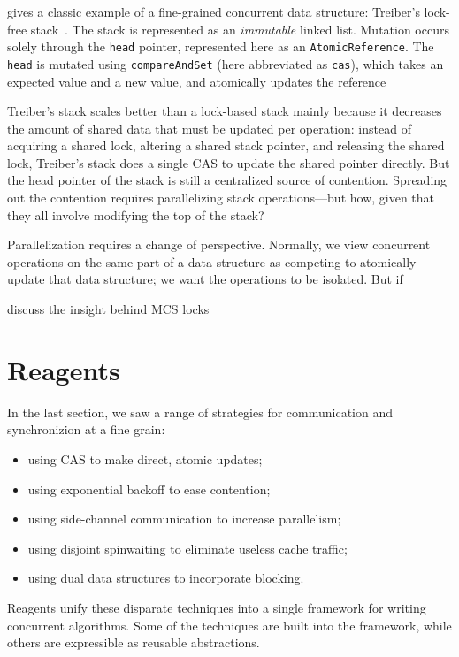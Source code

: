 \documentclass[preprint]{sigplanconf}
\begin{document}
 gives a classic example of a fine-grained
concurrent data structure: Treiber's lock-free stack~\cite{?}.  The
stack is represented as an \emph{immutable} linked list.  Mutation
occurs solely through the \lstinline{head} pointer, represented here
as an \lstinline{AtomicReference}.  The \lstinline{head} is mutated
using \lstinline{compareAndSet} (here abbreviated as \lstinline{cas}),
which takes an expected value and a new value, and atomically updates
the reference




Treiber's stack scales better than a lock-based stack mainly because
it decreases the amount of shared data that must be updated per
operation: instead of acquiring a shared lock, altering a shared stack
pointer, and releasing the shared lock, Treiber's stack does a single
CAS to update the shared pointer directly.  But the head pointer of
the stack is still a centralized source of contention.  Spreading out
the contention requires parallelizing stack operations---but how,
given that they all involve modifying the top of the stack?

Parallelization requires a change of perspective.  Normally, we view
concurrent operations on the same part of a data structure as
competing to atomically update that data structure; we want the
operations to be isolated.  But if 


discuss the insight behind MCS locks

\section{Reagents}
\label{sec:reagents}

In the last section, we saw a range of strategies for communication
and synchronizion at a fine grain:
\begin{itemize}
\item using CAS to make direct, atomic updates;
\item using exponential backoff to ease contention; 
\item using side-channel communication to increase parallelism; 
\item using disjoint spinwaiting to eliminate useless cache traffic; 
\item using dual data structures to incorporate blocking.
\end{itemize}
Reagents unify these disparate techniques into a single framework for
writing concurrent algorithms.  Some of the techniques are built into
the framework, while others are expressible as reusable abstractions.
\end{document}
